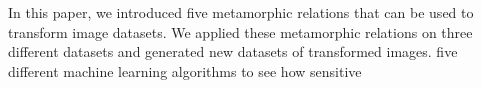 In this paper, we introduced five metamorphic relations that can be used to transform image datasets.
We applied these metamorphic relations on three different datasets and generated new datasets of transformed images.
five different machine learning algorithms to see how sensitive 
